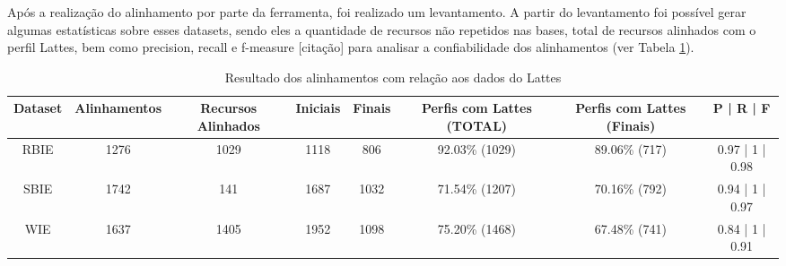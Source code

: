 Após a realização do alinhamento por parte da ferramenta, foi realizado um levantamento. A partir do levantamento foi possível gerar algumas estatísticas sobre esses datasets, sendo eles a quantidade de recursos não repetidos nas bases, total de recursos alinhados com o perfil Lattes, bem como precision, recall e f-measure [citação] para analisar a confiabilidade dos alinhamentos (ver Tabela \ref{tab:case_study}).

\begin{landscape}
\begin{table}[!ht]
\centering
\caption{ Resultado dos alinhamentos com relação aos dados do Lattes}
\label{tab:case_study}
\begin{tabular}{|c|c|c|c|c|c|c|c|}
\hline
Dataset & Alinhamentos & Recursos Alinhados & Iniciais & Finais & Perfis com Lattes (TOTAL) & Perfis com Lattes (Finais) & P | R | F \\ \hline
RBIE & 1276 & 1029 & 1118 & 806 & 92.03\% (1029) & 89.06\% (717) & 0.97 | 1 | 0.98 \\ \hline
SBIE & 1742 & 141 & 1687 & 1032 & 71.54\% (1207) & 70.16\% (792) & 0.94 | 1 | 0.97 \\ \hline
WIE & 1637 & 1405 & 1952 & 1098 & 75.20\% (1468) & 67.48\% (741) & 0.84 | 1 | 0.91 \\ \hline
\end{tabular}
\end{table}
\end{landscape}